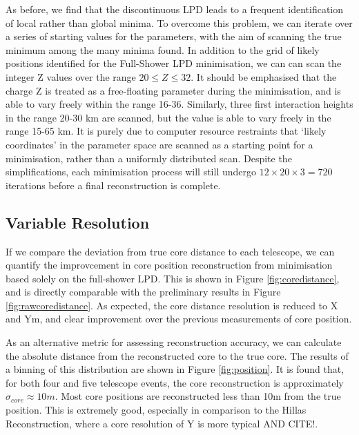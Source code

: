 \documentclass{article}
\begin{document}
As before, we find that the discontinuous LPD leads to a frequent identification of local rather than global minima. To overcome this problem, we can iterate over a series of starting values for the parameters, with the aim of scanning the true minimum among the many minima found. In addition to the grid of likely positions identified for the Full-Shower LPD minimisation, we can can scan the integer Z values over the range $ 20 \leq Z \leq 32 $. It should be emphasised that the charge Z is treated as a free-floating parameter during the minimisation, and is able to vary freely within the range 16-36. Similarly, three first interaction heights in the range 20-30 km are scanned, but the value is able to vary freely in the range 15-65 km. It is purely due to computer resource restraints that \textquoteleft likely coordinates' in the parameter space are scanned as a starting point for a minimisation, rather than a uniformly distributed scan. Despite the simplifications, each minimisation process will still undergo $12 \times 20 \times 3 = 720$ iterations before a final reconstruction is complete. 

\subsection{Variable Resolution}
If we compare the deviation from true core distance to each telescope, we can quantify the improvcement in core position reconstruction from minimisation based solely on the full-shower LPD. This is shown in Figure \ref{fig:coredistance}, and is directly comparable with the preliminary results in Figure \ref{fig:rawcoredistance}. As expected, the core distance resolution is reduced to X and Ym, and clear improvement over the previous measurements of core position. 

As an alternative metric for assessing reconstruction accuracy, we can calculate the absolute distance from the reconstructed core to the true core. The results of a binning of this distribution are shown in Figure \ref{fig:position}. It is found that, for both four and five telescope events, the core reconstruction is approximately $\sigma_{core} \approx 10m$. Most core positions are reconstructed less than 10m from the true position. This is extremely good, especially in comparison to the Hillas Reconstruction, where a core resolution of Y is more typical AND CITE!.
\end{document}

